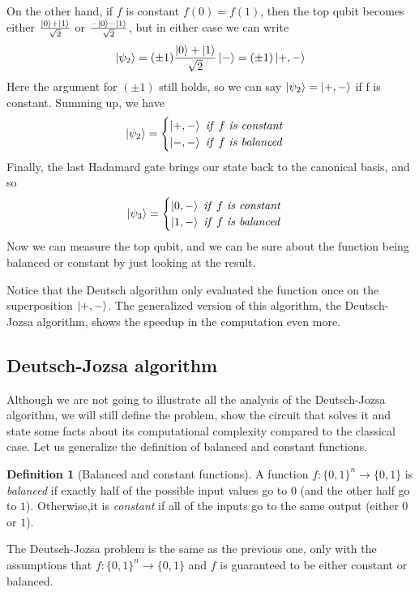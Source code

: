 \documentclass[12pt,a4paper]{report}
\theoremstyle{definition}
\newtheorem{definition}{Definition}[section]
\theoremstyle{definition}
\theoremstyle{definition}
\begin{document}
On the other hand, if $f$ is constant $f(0)=f(1)$, then the top qubit becomes either $\frac{\ket{0}+\ket{1}}{\sqrt{2}}$ or $\frac{-\ket{0}-\ket{1}}{\sqrt{2}}$, but in either case we can write
\begin{equation*}
    \ket{\psi_2}=(\pm 1)\frac{\ket{0}+\ket{1}}{\sqrt{2}}\ket{-}=(\pm 1)\ket{+,-}
\end{equation*}
Here the argument for $(\pm 1)$ still holds, so we can say $\ket{\psi_2}=\ket{+,-}$ if f is constant.
Summing up, we have
\begin{equation*}
    \ket{\psi_2}=\begin{cases}
        \ket{+,-}\ \mathit{if}\ f\ \mathit{is\ constant}\\
        \ket{-,-}\ \mathit{if}\ f\ \mathit{is\ balanced}
    \end{cases}
\end{equation*}
Finally, the last Hadamard gate brings our state back to the canonical basis, and so
\begin{equation*}
    \ket{\psi_3} = \begin{cases}
        \ket{0,-}\ \mathit{if}\ f\ \mathit{is\ constant}\\
        \ket{1,-}\ \mathit{if}\ f\ \mathit{is\ balanced}
    \end{cases}
\end{equation*}
Now we can measure the top qubit, and we can be sure about the function being balanced or constant by just looking at the result.

Notice that the Deutsch algorithm only evaluated the function once on the superposition $\ket{+,-}$. The generalized version of this algorithm, the Deutsch-Jozsa algorithm, shows the speedup in the computation even more.






\subsection{Deutsch-Jozsa algorithm}
Although we are not going to illustrate all the analysis of the Deutsch-Jozsa algorithm, we will still define the problem, show the circuit that solves it and state some facts about its computational complexity compared to the classical case.
Let us generalize the definition of balanced and constant functions.
\begin{definition}[Balanced and constant functions]
    A function $f: \{0,1\}^n \longrightarrow \{0,1\}$ is \textit{balanced} if exactly half of the possible input values go to $0$ (and the other half go to $1$). Otherwise,it is \textit{constant} if all of the inputs go to the same output (either $0$ or $1$).
\end{definition}
The Deutsch-Jozsa problem is the same as the previous one, only with the assumptions that $f:\{0,1\}^n\longrightarrow \{0,1\}$ and $f$ is guaranteed to be either constant or balanced.
\end{document}
